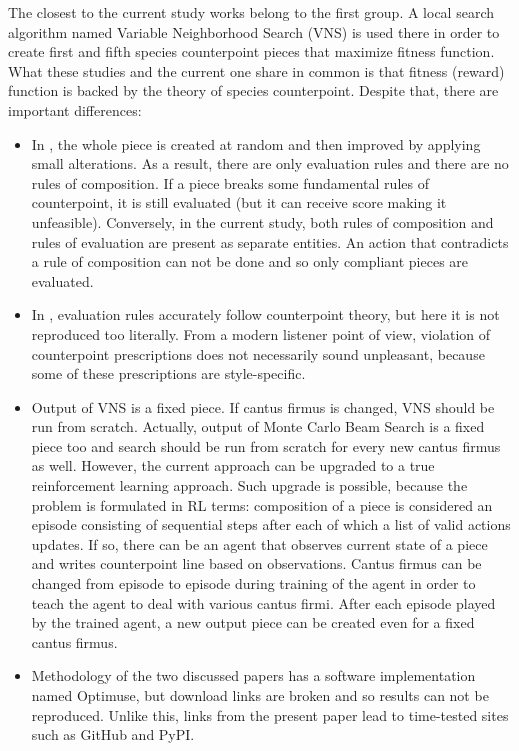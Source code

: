 \documentclass{article}
\begin{document}
The closest to the current study works \cite{herremans2012first, herremans2013fifth} belong to the first group. A local search algorithm named Variable Neighborhood Search (VNS) is used there in order to create first and fifth species counterpoint pieces that maximize fitness function. What these studies and the current one share in common is that fitness (reward) function is backed by the theory of species counterpoint. Despite that, there are important differences:
\begin{itemize}
	\item In \cite{herremans2012first, herremans2013fifth}, the whole piece is created at random and then improved by applying small alterations. As a result, there are only evaluation rules and there are no rules of composition. If a piece breaks some fundamental rules of counterpoint, it is still evaluated (but it can receive score making it unfeasible). Conversely, in the current study, both rules of composition and rules of evaluation are present as separate entities. An action that contradicts a rule of composition can not be done and so only compliant pieces are evaluated.
	\item In \cite{herremans2012first, herremans2013fifth}, evaluation rules accurately follow counterpoint theory, but here it is not reproduced too literally. From a modern listener point of view, violation of counterpoint prescriptions does not necessarily sound unpleasant, because some of these prescriptions are style-specific.
	\item Output of VNS is a fixed piece. If cantus firmus is changed, VNS should be run from scratch. Actually, output of Monte Carlo Beam Search is a fixed piece too and search should be run from scratch for every new cantus firmus as well. However, the current approach can be upgraded to a true reinforcement learning approach. Such upgrade is possible, because the problem is formulated in RL terms: composition of a piece is considered an episode consisting of sequential steps after each of which a list of valid actions updates. If so, there can be an agent that observes current state of a piece and writes counterpoint line based on observations. Cantus firmus can be changed from episode to episode during training of the agent in order to teach the agent to deal with various cantus firmi. After each episode played by the trained agent, a new output piece can be created even for a fixed cantus firmus.
	\item Methodology of the two discussed papers has a software implementation named Optimuse, but download links are broken and so results can not be reproduced. Unlike this, links from the present paper lead to time-tested sites such as GitHub and PyPI.
\end{itemize}
\end{document}
